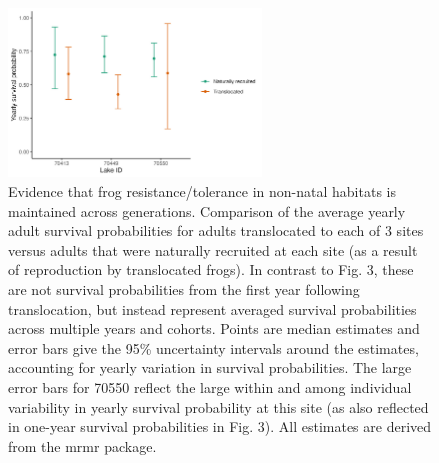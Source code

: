 \documentclass[9pt,twoside,lineno]{pnas-new}
\begin{document}
\begin{figure}

{\centering \includegraphics[width=0.60\textwidth]{figures/compare_surv_probs.jpg}

}

\caption{\label{fig-compare_surv_probs}Evidence that frog
resistance/tolerance in non-natal habitats is maintained across
generations. Comparison of the average yearly adult survival
probabilities for adults translocated to each of 3 sites versus adults
that were naturally recruited at each site (as a result of reproduction
by translocated frogs). In contrast to
Fig. 3, these are not survival
probabilities from the first year following translocation, but instead
represent averaged survival probabilities across multiple years and
cohorts. Points are median estimates and error bars give the 95\%
uncertainty intervals around the estimates, accounting for yearly
variation in survival probabilities. The large error bars for 70550
reflect the large within and among individual variability in yearly
survival probability at this site (as also reflected in one-year
survival probabilities in Fig. 3). All
estimates are derived from the mrmr package.}

\end{figure}\clearpage
\end{document}
